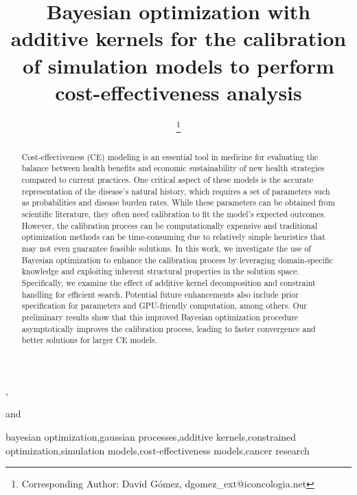 \documentclass{IOS-Book-Article}
\def\hb{\hbox to 11.5 cm{}}
\begin{document}
	
	\pagestyle{headings}
	\def\thepage{}
	\begin{frontmatter}              %
		
		
		\title{Bayesian optimization with additive kernels for the calibration of simulation models to perform cost-effectiveness analysis}
		
		\markboth{}{April 2023\hb}
		
		\author[A,B,C]{ %
			\thanks{Corresponding Author: David Gómez, dgomez\_ext@iconcologia.net}},
		\author[A,B,C]{ }
		\author[D]{ }
		and
		\author[D]{ }
		
		\address[A]{Universitat Autònoma de Barcelona (UAB)}
		\address[B]{Institut Català d'Oncologia (ICO)}
		\address[C]{Institut d'Investigació Biomèdica de Bellvitge (IDIBELL)}
		\address[D]{Institut d'Investigació en Intel·ligència Artificial - Consell Superior d'Investigacions Científiques (IIIA-CSIC)}
		
		\begin{abstract}
			Cost-effectiveness (CE) modeling is an essential tool in medicine for evaluating the balance between health benefits and economic sustainability of new health strategies compared to current practices. One critical aspect of these models is the accurate representation of the disease's natural history, which requires a set of parameters such as probabilities and disease burden rates. While these parameters can be obtained from scientific literature, they often need calibration to fit the model's expected outcomes. However, the calibration process can be computationally expensive and traditional optimization methods can be time-consuming due to relatively simple heuristics that may not even guarantee feasible solutions.
			In this work, we investigate the use of Bayesian optimization to enhance the calibration process by leveraging domain-specific knowledge and exploiting inherent structural properties in the solution space. Specifically, we examine the effect of additive kernel decomposition and constraint handling for efficient search. Potential future enhancements also include prior specification for parameters and GPU-friendly computation, among others.
			Our preliminary results show that this improved Bayesian optimization procedure asymptotically improves the calibration process, leading to faster convergence and better solutions for larger CE models.
		\end{abstract}
		
		\begin{keyword}
			bayesian optimization\sep gaussian processes\sep additive kernels\sep constrained optimization\sep simulation models\sep cost-effectiveness models\sep  cancer research
		\end{keyword}
	\end{frontmatter}
	\markboth{April 2023\hb}{April 2023\hb}
	
\end{document}
